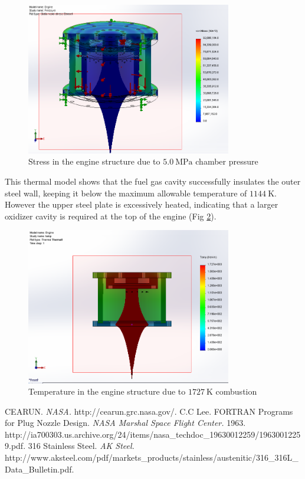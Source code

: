 \documentclass{article}
\begin{document}
\begin{figure}[h!]
\centering
\includegraphics[width = 0.8\textwidth]{engine_pressure.png}
\caption{Stress in the engine structure due to $\SI{5.0}{\mega\pascal}$ chamber pressure} 
\label{engine_pressure}
\end{figure}
This thermal model shows that the fuel gas cavity successfully insulates the outer steel wall, keeping it below the maximum allowable temperature of $\SI{1144}{\kelvin}$. However the upper steel plate is excessively heated, indicating that a larger oxidizer cavity is required at the top of the engine (Fig \ref{engine_temperature}).
\begin{figure}[h!]
\centering
\includegraphics[width = 0.8\textwidth]{engine_temp_fail.png}
\caption{Temperature in the engine structure due to $\SI{1727}{\kelvin}$ combustion} 
\label{engine_temperature}
\end{figure}
\begin{thebibliography}{9}
	 CEARUN. \emph{NASA.} http://cearun.grc.nasa.gov/.
	 C.C Lee. FORTRAN Programs for Plug Nozzle Design. \emph{NASA Marshal Space Flight Center.} 1963. http://ia700303.us.archive.org/24/items/nasa\_techdoc\_19630012259/19630012259.pdf.
	 316 Stainless Steel. \emph{AK Steel.} http://www.aksteel.com/pdf/markets\_products/stainless/austenitic/316\_316L\_Data\_Bulletin.pdf.
\end{thebibliography}
\end{document}
